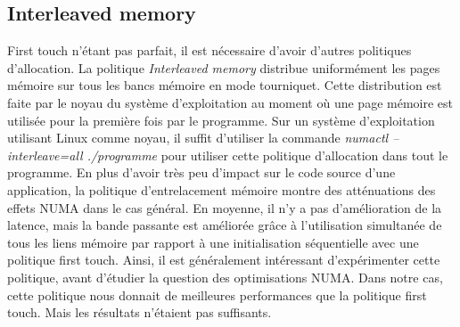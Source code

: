 \subsection{Interleaved memory}
First touch n'étant pas parfait, il est nécessaire d'avoir d'autres politiques d'allocation.
%
La politique {\em Interleaved memory} distribue uniformément les pages mémoire sur tous les bancs mémoire en mode tourniquet.
%
Cette distribution est faite par le noyau du système d'exploitation au moment où une page mémoire est utilisée pour la première fois par le programme.
%
Sur un système d'exploitation utilisant Linux comme noyau, il suffit d'utiliser la commande {\em numactl --interleave=all ./programme} pour utiliser cette politique d'allocation dans tout le programme.
%
En plus d'avoir très peu d'impact sur le code source d'une application, la politique d'entrelacement mémoire montre des atténuations des effets NUMA dans le cas général.
%
En moyenne, il n'y a pas d'amélioration de la latence, mais la bande passante est améliorée grâce à l'utilisation simultanée de tous les liens mémoire par rapport à une initialisation séquentielle avec une politique first touch.
%
Ainsi, il est généralement intéressant d'expérimenter cette politique, avant d'étudier la question des optimisations NUMA.
%
Dans notre cas, cette politique nous donnait de meilleures performances que la politique first touch.
%
Mais les résultats n'étaient pas suffisants.
